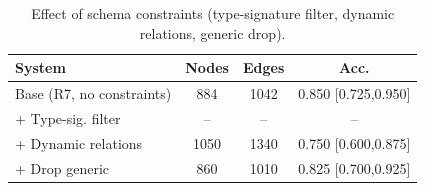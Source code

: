 \begin{table}[t]
\centering
\caption{Effect of schema constraints (type-signature filter, dynamic relations, generic drop).}
\label{tab:constraints}
\begin{tabular}{lccc}
\toprule
System & Nodes & Edges & Acc. \\
\midrule
Base (R7, no constraints) & 884 & 1042 & 0.850 [0.725,0.950] \\
+ Type-sig. filter & -- & -- & -- \\
+ Dynamic relations & 1050 & 1340 & 0.750 [0.600,0.875] \\
+ Drop generic & 860 & 1010 & 0.825 [0.700,0.925] \\
\bottomrule
\end{tabular}
\end{table}